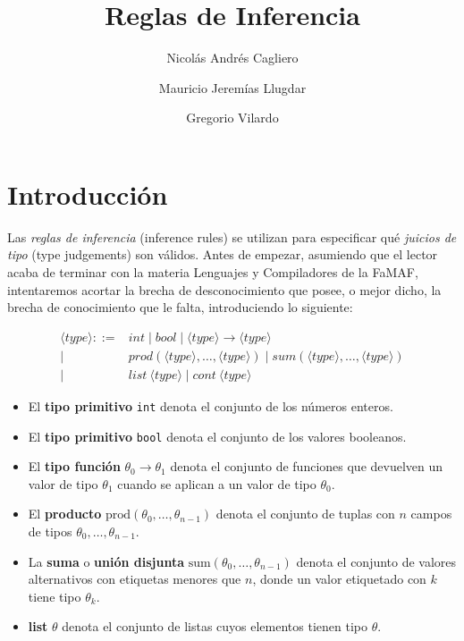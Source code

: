 \documentclass[runningheads]{llncs}
\begin{document}
\title{Reglas de Inferencia}

\author{Nicolás Andrés Cagliero \and Mauricio Jeremías Llugdar \and Gregorio Vilardo}


\maketitle


\section{Introducción}

Las \emph{reglas de inferencia} (inference rules) se utilizan para especificar qué \emph{juicios de tipo} (type judgements) son válidos. Antes de empezar, asumiendo que el lector acaba de terminar con la materia Lenguajes y Compiladores de la FaMAF, intentaremos acortar la brecha de desconocimiento que posee, o mejor dicho, la brecha de conocimiento que le falta, introduciendo lo siguiente\cite{reynolds}:

\begin{align*}
\langle type \rangle ::= & int \mid bool \mid \langle type \rangle \rightarrow \langle type \rangle \\
\mid & prod(\langle type \rangle, \ldots, \langle type \rangle) \mid sum(\langle type \rangle, \ldots, \langle type \rangle) \\
\mid & list \ \langle type \rangle \mid cont \ \langle type \rangle
\end{align*}

\begin{itemize}
\item El \textbf{tipo primitivo} \texttt{int} denota el conjunto de los números enteros.
\item El \textbf{tipo primitivo} \texttt{bool} denota el conjunto de los valores booleanos.
\item El \textbf{tipo función} \(\theta_0 \to \theta_1\) denota el conjunto de funciones que devuelven un valor de tipo \(\theta_1\) cuando se aplican a un valor de tipo \(\theta_0\).
\item El \textbf{producto} \(\text{prod}(\theta_0, \ldots, \theta_{n-1})\) denota el conjunto de tuplas con \(n\) campos de tipos \(\theta_0, \ldots, \theta_{n-1}\).
\item La \textbf{suma} o \textbf{unión disjunta} \(\text{sum}(\theta_0, \ldots, \theta_{n-1})\) denota el conjunto de valores alternativos con etiquetas menores que \(n\), donde un valor etiquetado con \(k\) tiene tipo \(\theta_k\).
\item \textbf{list} \(\theta\) denota el conjunto de listas cuyos elementos tienen tipo \(\theta\).
\end{itemize}
\end{document}
